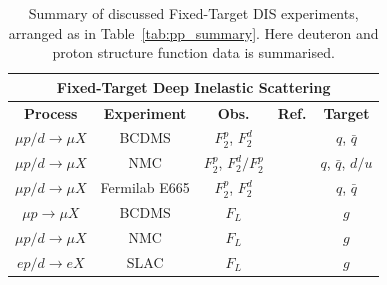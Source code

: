 \documentclass[12pt,twoside,openright]{report}
\begin{document}
\begin{spacing}{1.5}
\begin{table}
\label{tab:FTDIS_summary}
\begin{center}
\begin{tabular}{|c|c|c|c|c|}
\hline
\multicolumn{5}{|c|}{ \textbf{Fixed-Target Deep Inelastic Scattering} }\\
\hline
\textbf{Process} & \textbf{Experiment} & \textbf{Obs.}& \textbf{Ref.} &  \textbf{Target} \\
\hline\hline
$\mu p/d \to \mu X$ & BCDMS& $F_2^p$, $F_2^d$ &\cite{Benvenuti:1989rh,Benvenuti:1989fm} & $q$, $\bar{q}$\\
$\mu p/d \to \mu X$ & NMC &$F_2^p$, $F_2^d/F_2^p$ & \cite{Arneodo:1996kd,Arneodo:1996qe} & $q$, $\bar{q}$, $d/u$\\
$\mu p/d \to \mu X$ & Fermilab E665 & $F_2^p$, $F_2^d$ & \cite{Adams:1996gu} & $q$, $\bar{q}$\\
\hline
$\mu p \to \mu X$ & BCDMS &$F_L$ &\cite{Benvenuti:1989rh} & $g$ \\
$\mu p/d \to \mu X$ & NMC &$F_L$ & \cite{Arneodo:1996qe} & $g$\\
$e p/d \to e X$ & SLAC &$F_L$& \cite{Whitlow:1990gk} & $g$\\
\hline
\end{tabular}
\end{center}
\caption{Summary of discussed Fixed-Target DIS experiments, arranged as in Table~\ref{tab:pp_summary}. Here deuteron and proton structure function data is summarised.}
\end{table}%



\end{spacing}
\end{document}
